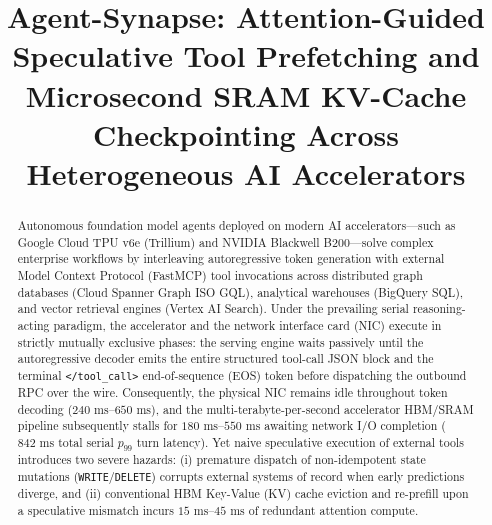 \documentclass[10pt,conference]{IEEEtran}
\begin{document}
\title{Agent-Synapse: Attention-Guided Speculative Tool Prefetching and Microsecond SRAM KV-Cache Checkpointing Across Heterogeneous AI Accelerators}

\author{
}

\maketitle

\begin{abstract}
Autonomous foundation model agents deployed on modern AI accelerators---such as Google Cloud TPU v6e (Trillium) and NVIDIA Blackwell B200---solve complex enterprise workflows by interleaving autoregressive token generation with external Model Context Protocol (FastMCP) tool invocations across distributed graph databases (Cloud Spanner Graph ISO GQL), analytical warehouses (BigQuery SQL), and vector retrieval engines (Vertex AI Search). Under the prevailing serial reasoning-acting paradigm, the accelerator and the network interface card (NIC) execute in strictly mutually exclusive phases: the serving engine waits passively until the autoregressive decoder emits the entire structured tool-call JSON block and the terminal \texttt{</tool\_call>} end-of-sequence (EOS) token before dispatching the outbound RPC over the wire. Consequently, the physical NIC remains idle throughout token decoding ($240\text{ ms}$--$650\text{ ms}$), and the multi-terabyte-per-second accelerator HBM/SRAM pipeline subsequently stalls for $180\text{ ms}$--$550\text{ ms}$ awaiting network I/O completion ($842\text{ ms}$ total serial $p_{99}$ turn latency). Yet naive speculative execution of external tools introduces two severe hazards: (i) premature dispatch of non-idempotent state mutations (\texttt{WRITE}/\texttt{DELETE}) corrupts external systems of record when early predictions diverge, and (ii) conventional HBM Key-Value (KV) cache eviction and re-prefill upon a speculative mismatch incurs $15\text{ ms}$--$45\text{ ms}$ of redundant attention compute.


\end{abstract}
\end{document}
